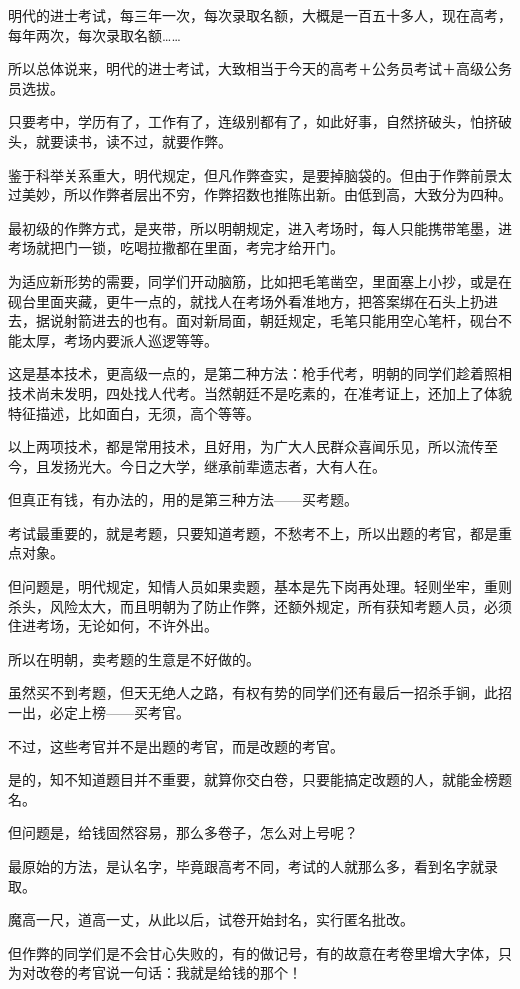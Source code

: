 \begin{multicols}{\theparacolNo}
明代的进士考试，每三年一次，每次录取名额，大概是一百五十多人，现在高考，每年两次，每次录取名额……

所以总体说来，明代的进士考试，大致相当于今天的高考＋公务员考试＋高级公务员选拔。

只要考中，学历有了，工作有了，连级别都有了，如此好事，自然挤破头，怕挤破头，就要读书，读不过，就要作弊。

鉴于科举关系重大，明代规定，但凡作弊查实，是要掉脑袋的。但由于作弊前景太过美妙，所以作弊者层出不穷，作弊招数也推陈出新。由低到高，大致分为四种。

最初级的作弊方式，是夹带，所以明朝规定，进入考场时，每人只能携带笔墨，进考场就把门一锁，吃喝拉撒都在里面，考完才给开门。

为适应新形势的需要，同学们开动脑筋，比如把毛笔凿空，里面塞上小抄，或是在砚台里面夹藏，更牛一点的，就找人在考场外看准地方，把答案绑在石头上扔进去，据说射箭进去的也有。面对新局面，朝廷规定，毛笔只能用空心笔杆，砚台不能太厚，考场内要派人巡逻等等。

这是基本技术，更高级一点的，是第二种方法：枪手代考，明朝的同学们趁着照相技术尚未发明，四处找人代考。当然朝廷不是吃素的，在准考证上，还加上了体貌特征描述，比如面白，无须，高个等等。

以上两项技术，都是常用技术，且好用，为广大人民群众喜闻乐见，所以流传至今，且发扬光大。今日之大学，继承前辈遗志者，大有人在。

但真正有钱，有办法的，用的是第三种方法——买考题。

考试最重要的，就是考题，只要知道考题，不愁考不上，所以出题的考官，都是重点对象。

但问题是，明代规定，知情人员如果卖题，基本是先下岗再处理。轻则坐牢，重则杀头，风险太大，而且明朝为了防止作弊，还额外规定，所有获知考题人员，必须住进考场，无论如何，不许外出。

所以在明朝，卖考题的生意是不好做的。

虽然买不到考题，但天无绝人之路，有权有势的同学们还有最后一招杀手锏，此招一出，必定上榜——买考官。

不过，这些考官并不是出题的考官，而是改题的考官。

是的，知不知道题目并不重要，就算你交白卷，只要能搞定改题的人，就能金榜题名。

但问题是，给钱固然容易，那么多卷子，怎么对上号呢？

最原始的方法，是认名字，毕竟跟高考不同，考试的人就那么多，看到名字就录取。

魔高一尺，道高一丈，从此以后，试卷开始封名，实行匿名批改。

但作弊的同学们是不会甘心失败的，有的做记号，有的故意在考卷里增大字体，只为对改卷的考官说一句话：我就是给钱的那个！


\end{multicols}
